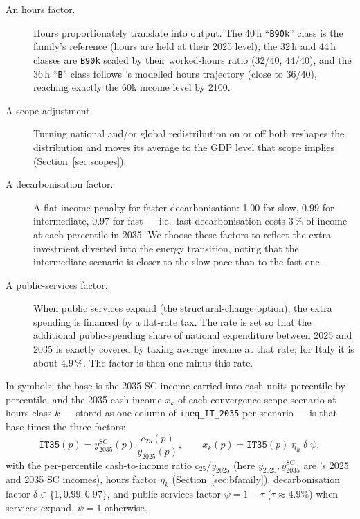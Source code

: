 \documentclass[12pt,a4paper]{article}
\newcommand{\scenario}[1]{\texttt{#1}}
\newcommand{\col}[1]{\texttt{#1}}
\newcommand{\file}[1]{\texttt{#1}}
\begin{document}
\begin{description}
  \item[An hours factor.] Hours proportionately translate into output. The 40\,h ``\scenario{B90k}'' class is the family's reference (hours are held at their 2025 level); the 32\,h and 44\,h classes are \scenario{B90k} scaled by their worked-hours ratio (32/40, 44/40), and the 36\,h ``\scenario{B}'' class follows \cite{Chancel2026}'s modelled hours trajectory (close to $36/40$), reaching exactly the 60k income level by 2100. %
  \item[A scope adjustment.] Turning national and/or global redistribution on or off both reshapes the distribution and moves its average to the GDP level that scope implies (Section~\ref{sec:scopes}).
  \item[A decarbonisation factor.] A flat income penalty for faster decarbonisation: 1.00 for slow, 0.99 for intermediate, 0.97 for fast --- i.e.\ fast decarbonisation costs 3\,\% of income at each percentile in 2035. We choose these factors to reflect the extra investment diverted into the energy transition, noting that the intermediate scenario is closer to the slow pace than to the fast one. 
  \item[A public-services factor.] When public services expand (the structural-change option), the extra spending is financed by a flat-rate tax. The rate is set so that the additional public-spending share of national expenditure between 2025 and 2035 is exactly covered by taxing average income at that rate; for Italy it is about 4.9\,\%. The factor is then one minus this rate.
\end{description}

\noindent In symbols, the base is the 2035 SC income carried into cash units percentile by percentile, and the 2035 cash income $x_k$ of each convergence-scope scenario at hours class $k$ --- stored as one column of \file{ineq\_IT\_2035} per scenario --- is that base times the three factors:
\[
  \col{IT35}(p)=y^{\mathrm{SC}}_{2035}(p)\,\frac{c_{25}(p)}{y_{2025}(p)},
  \qquad
  x_k(p)=\col{IT35}(p)\;\eta_k\;\delta\;\psi,
\]
with the per-percentile cash-to-income ratio $c_{25}/y_{2025}$ (here $y_{2025},y^{\mathrm{SC}}_{2035}$ are \citeauthor{Bothe2026}'s 2025 and 2035 SC incomes), hours factor $\eta_k$ (Section~\ref{sec:bfamily}), decarbonisation factor $\delta\in\{1,0.99,0.97\}$, and public-services factor $\psi=1-\tau$ ($\tau\approx4.9\%$) when services expand, $\psi=1$ otherwise.
\end{document}
